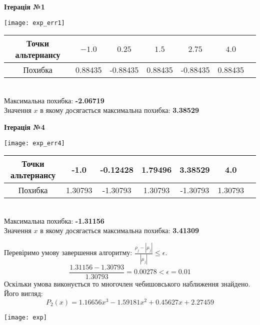 \documentclass[ukrainian,14pt]{extarticle}
\begin{document}
\begin{center}
\textbf{Ітерація №1}
\end{center}

\texttt{[image: exp\_err1]}
\begin{tabular}{|c|c|c|c|c|c|c}
\hline
\rule{0pt}{4ex}
Точки альтернансу & $-1.0$ & $0.25$ & $1.5$ & $2.75$ & $4.0$ \\ \hline
\rule{0pt}{4ex} 
Похибка & 0.88435 & -0.88435 & 0.88435 & -0.88435 & 0.88435  \\ \hline 
\end{tabular}\\

\noindent
Максимальна похибка: \textbf{-2.06719}\\
Значення $x$ в якому досягається максимальна похибка: \textbf{3.38529}


\newpage

\begin{center}
\textbf{Ітерація №4}
\end{center}

\texttt{[image: exp\_err4]}
\begin{tabular}{|c|c|c|c|c|c|c}
\hline
\rule{0pt}{4ex} 
Точки альтернансу & -1.0 & -0.12428 & 1.79496 & 3.38529 & 4.0 \\\hline
\rule{0pt}{4ex} 
Похибка & 1.30793 & -1.30793 & 1.30793 & -1.30793 & 1.30793  \\ \hline 
\end{tabular}\\

\noindent
Максимальна похибка: \textbf{-1.31156}\\
Значення $x$ в якому досягається максимальна похибка: \textbf{3.41309}

\newpage

Перевіримо умову завершення алгоритму: $\frac{\rho_j - |\mu_j|}{|\mu_j|} \leq \epsilon.$ \\

$$\frac{1.31156 - 1.30793}{1.30793} = 0.00278 < \epsilon = 0.01$$
Оскільки умова виконується  то многочлен чебишовського наближення знайдено. Його вигляд:\\
$$P_2(x) = 1.16656 x^{3} - 1.59181 x^{2} + 0.45627 x + 2.27459$$

\texttt{[image: exp]}
\end{document}
